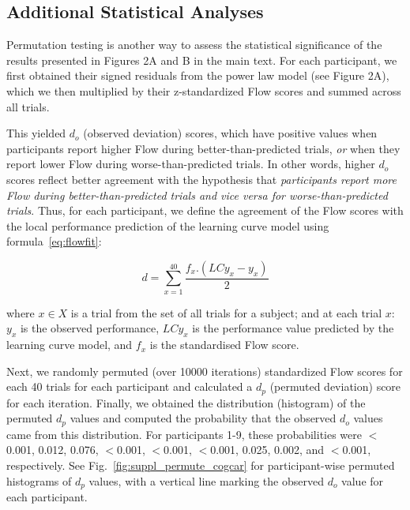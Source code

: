 \documentclass{article}
\begin{document}
\subsection*{Additional Statistical Analyses}

Permutation testing is another way to assess the statistical significance of the results presented in Figures 2A and B in the main text. For each participant, we first obtained their signed residuals from the power law model (see Figure 2A), which we then multiplied by their z-standardized Flow scores and summed across all trials.

This yielded $d_o$ (observed deviation) scores, which have positive values when participants report higher Flow during better-than-predicted trials, {\it or} when they report lower Flow during worse-than-predicted trials. In other words, higher $d_o$ scores reflect better agreement with the hypothesis that {\it participants report more Flow during better-than-predicted trials and vice versa for worse-than-predicted trials}. Thus, for each participant, we define the agreement of the Flow scores with the local performance prediction of the learning curve model using formula~\ref{eq:flowfit}:

\begin{equation}
	\label{eq:flowfit}
	d = \sum_{x=1}^{40} \frac{f_x.(LCy_x - y_x)}{2}
\end{equation}

where $x\in X$ is a trial from the set of all trials for a subject; and at each trial $x$: $y_x$ is the observed performance, $LCy_x$ is the performance value predicted by the learning curve model, and $f_x$ is the standardised Flow score.

Next, we randomly permuted (over 10000 iterations) standardized Flow scores for each 40 trials for each participant and calculated a $d_p$ (permuted deviation) score for each iteration. Finally, we obtained the distribution (histogram) of the permuted $d_p$ values and computed the probability that the observed $d_o$ values came from this distribution. For participants 1-9, these probabilities were $<$0.001, 0.012, 0.076, $<$0.001, $<$0.001, $<$0.001, 0.025, 0.002, and $<$0.001, respectively. See Fig.~\ref{fig:suppl_permute_cogcar} for participant-wise permuted histograms of $d_p$ values, with a vertical line marking the observed $d_o$ value for each participant.
\end{document}
